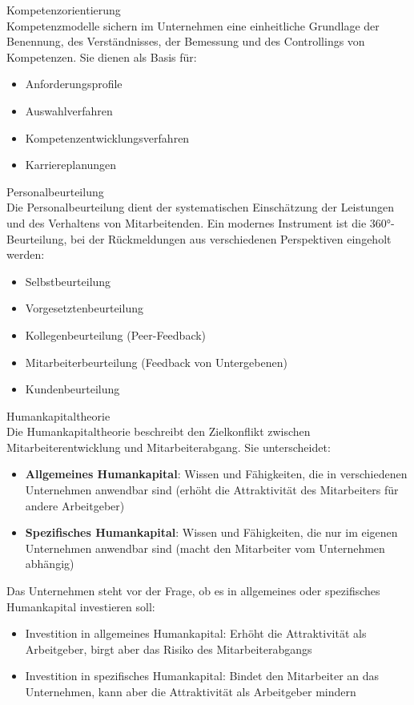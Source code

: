 \begin{concept}{Kompetenzorientierung}\\
Kompetenzmodelle sichern im Unternehmen eine einheitliche Grundlage der Benennung, des Verständnisses, der Bemessung und des Controllings von Kompetenzen. Sie dienen als Basis für:
\begin{itemize}
    \item Anforderungsprofile
    \item Auswahlverfahren
    \item Kompetenzentwicklungsverfahren
    \item Karriereplanungen
\end{itemize}
\end{concept}

\begin{definition}{Personalbeurteilung}\\
Die Personalbeurteilung dient der systematischen Einschätzung der Leistungen und des Verhaltens von Mitarbeitenden. Ein modernes Instrument ist die 360°-Beurteilung, bei der Rückmeldungen aus verschiedenen Perspektiven eingeholt werden:
\begin{itemize}
    \item Selbstbeurteilung
    \item Vorgesetztenbeurteilung
    \item Kollegenbeurteilung (Peer-Feedback)
    \item Mitarbeiterbeurteilung (Feedback von Untergebenen)
    \item Kundenbeurteilung
\end{itemize}
\end{definition}

\begin{concept}{Humankapitaltheorie}\\
Die Humankapitaltheorie beschreibt den Zielkonflikt zwischen Mitarbeiterentwicklung und Mitarbeiterabgang. Sie unterscheidet:
\begin{itemize}
    \item \textbf{Allgemeines Humankapital}: Wissen und Fähigkeiten, die in verschiedenen Unternehmen anwendbar sind (erhöht die Attraktivität des Mitarbeiters für andere Arbeitgeber)
    \item \textbf{Spezifisches Humankapital}: Wissen und Fähigkeiten, die nur im eigenen Unternehmen anwendbar sind (macht den Mitarbeiter vom Unternehmen abhängig)
\end{itemize}

Das Unternehmen steht vor der Frage, ob es in allgemeines oder spezifisches Humankapital investieren soll:
\begin{itemize}
    \item Investition in allgemeines Humankapital: Erhöht die Attraktivität als Arbeitgeber, birgt aber das Risiko des Mitarbeiterabgangs
    \item Investition in spezifisches Humankapital: Bindet den Mitarbeiter an das Unternehmen, kann aber die Attraktivität als Arbeitgeber mindern
\end{itemize}
\end{concept}

